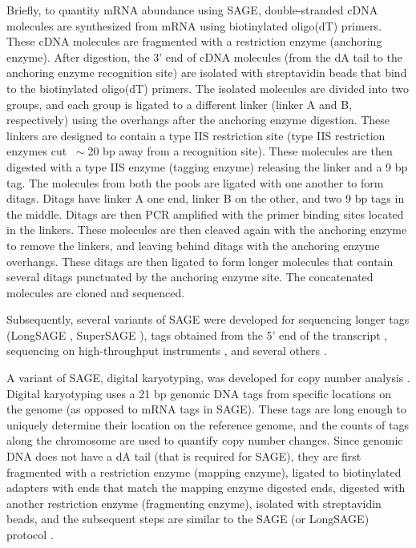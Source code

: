 Briefly, to quantity mRNA abundance using SAGE, double-stranded cDNA
molecules are synthesized from mRNA using biotinylated oligo(dT) primers.
These cDNA molecules are fragmented with a restriction enzyme (anchoring
enzyme).
%
After digestion, the 3' end of cDNA molecules (from the dA tail to the
anchoring enzyme recognition site) are isolated with streptavidin beads
that bind to the biotinylated oligo(dT) primers.
%
The isolated molecules are divided into two groups, and each group is
ligated to a different linker (linker A and B, respectively) using the
overhangs after the anchoring enzyme digestion. These linkers are
designed to contain a type IIS restriction site (type IIS restriction
enzymes cut $~\sim$20 bp away from a recognition site).
%
These molecules are then digested with a type IIS enzyme (tagging
enzyme) releasing the linker and a 9 bp tag.
%
The molecules from both the pools are ligated with one another to form
ditags. Ditags have linker A one end, linker B on the other, and two 9
bp tags in the middle.
%
Ditags are then PCR amplified with the primer binding sites located in
the linkers.
%
These molecules are then cleaved again with the anchoring enzyme to
remove the linkers, and leaving behind ditags with the anchoring enzyme
overhangs.  These ditags are then ligated to form longer molecules
that contain several ditags punctuated by the anchoring enzyme site.
%
The concatenated molecules are cloned and sequenced.


Subsequently, several variants of SAGE were developed for sequencing longer
tags (LongSAGE \citep{saha2002using,hu2006serial}, SuperSAGE
\citep{matsumura2003gene}), tags obtained from the 5'
end of the transcript \citep{wei20045}, sequencing on high-throughput
instruments \citep{matsumura2010high},  and several others
\citep{zawada2014massive,peters1999comprehensive}.


A variant of SAGE, digital karyotyping, was developed for copy number
analysis \citep{wang2002digital,leary2007digital}. Digital karyotyping
uses a 21 bp genomic DNA tags from specific locations on the genome (as
opposed to mRNA tags in SAGE).  These tags are long enough to uniquely
determine their location on the reference genome, and the counts of
tags along the chromosome are used to quantify copy number changes.
%
Since genomic DNA does not have a dA tail (that is required for SAGE),
they are first fragmented with a restriction enzyme (mapping enzyme),
ligated to biotinylated adapters with ends that match the mapping
enzyme digested ends, digested with another restriction enzyme
(fragmenting enzyme), isolated with streptavidin beads, and the
subsequent steps are similar to the SAGE (or LongSAGE) protocol
\citep{wang2002digital,leary2007digital}.

